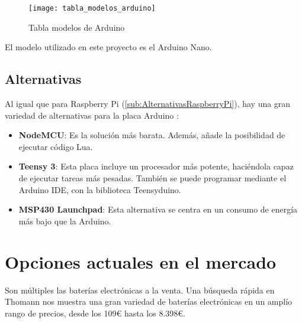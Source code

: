             \begin{figure}[ht]
                \centering
                \texttt{[image: tabla\_modelos\_arduino]}
                \caption{Tabla modelos de Arduino \cite{arduino_compare}\label{fig:ImagenModelosArduino}}
            \end{figure}

            El modelo utilizado en este proyecto es el Arduino Nano.


        \subsection{Alternativas} %
        \label{sub:AlternativasArduino}

            Al igual que para Raspberry Pi (\ref{sub:AlternativasRaspberryPi}), hay una gran variedad de alternativas
            para la placa Arduino \cite{alternativas_arduino}:

            \begin{itemize}
                \item \textbf{NodeMCU}: Es la solución más barata. Además, añade la posibilidad de ejecutar código Lua.
                \item \textbf{Teensy 3}: Esta placa incluye un procesador más potente, haciéndola capaz de ejecutar
                tareas más pesadas. También se puede programar mediante el Arduino IDE, con la biblioteca Teensyduino.
                \item \textbf{MSP430 Launchpad}: Esta alternativa se centra en un consumo de energía más bajo que la
                Arduino.
            \end{itemize}



    \section{Opciones actuales en el mercado} %
    \label{sec:OpcionesActualesEnElMercado}

        Son múltiples las baterías electrónicas a la venta. Una búsqueda rápida en Thomann \cite{thomann_baterias} nos
        muestra una gran variedad de baterías electrónicas en un amplío rango de precios, desde los 109\euro{} hasta los
        8.398\euro{}.

